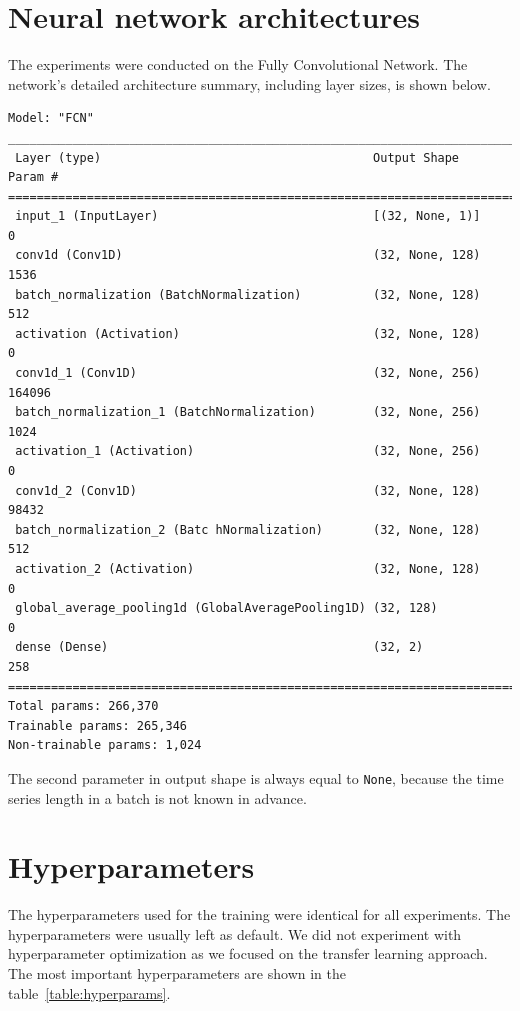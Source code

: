 \documentclass[a4paper,11pt,twoside]{report}
\theoremstyle{definition}
\begin{document}
\section{Neural network architectures}
The experiments were conducted on the Fully Convolutional Network. The network's detailed architecture summary, including layer sizes, is shown below. \begin{verbatim}
Model: "FCN"
_________________________________________________________________________________
 Layer (type)                                      Output Shape            Param #
=================================================================================
 input_1 (InputLayer)                              [(32, None, 1)]         0
 conv1d (Conv1D)                                   (32, None, 128)         1536
 batch_normalization (BatchNormalization)          (32, None, 128)         512
 activation (Activation)                           (32, None, 128)         0
 conv1d_1 (Conv1D)                                 (32, None, 256)         164096
 batch_normalization_1 (BatchNormalization)        (32, None, 256)         1024
 activation_1 (Activation)                         (32, None, 256)         0
 conv1d_2 (Conv1D)                                 (32, None, 128)         98432
 batch_normalization_2 (Batc hNormalization)       (32, None, 128)         512
 activation_2 (Activation)                         (32, None, 128)         0
 global_average_pooling1d (GlobalAveragePooling1D) (32, 128)               0
 dense (Dense)                                     (32, 2)                 258
=================================================================================
Total params: 266,370
Trainable params: 265,346
Non-trainable params: 1,024
\end{verbatim}
The second parameter in output shape is always equal to \texttt{None}, because the time series length in a batch is not known in advance.
\section{Hyperparameters}\label{section:hyperparameters}
The hyperparameters used for the training were identical for all experiments. The hyperparameters were usually left as default. We did not experiment with hyperparameter optimization as we focused on the transfer learning approach. The most important hyperparameters are shown in the table~\ref{table:hyperparams}.

\FloatBarrier
\end{document}
